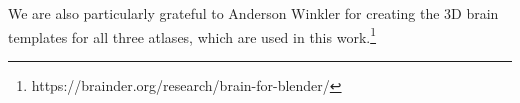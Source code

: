 \documentclass{llncs}
\begin{document}
We are also particularly grateful to Anderson Winkler for creating the 3D brain templates for all three atlases, which are used in this work.\footnote{https://brainder.org/research/brain-for-blender/}





% 
% 
% 
% 
% 
% 
% 
\end{document}
